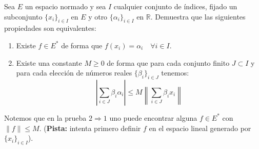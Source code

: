 \begin{ejercicio}%
    Sea $E$ un espacio normado y sea $I$ cualquier conjunto de índices, fijado un subconjunto $\{x_i\}_{i \in I}$ en $E$ y otro $\{\alpha_i\}_{i \in I}$ en $\mathbb{R}$. Demuestra que las siguientes propiedades son equivalentes:
    \begin{enumerate}
        \item Existe $f\in E^\ast$ de forma que $f(x_i) = \alpha_i\quad \forall i \in I$.
        \item Existe una constante $M\geq 0$ de forma que para cada conjunto finito $J\subset I$ y para cada elección de números reales $\{\beta_i\}_{i \in J}$ tenemos:
            \begin{equation*}
                \left|\sum_{i \in J}\beta_i \alpha_i\right| \leq M \left\|\sum_{i \in J} \beta_i x_i\right\|
            \end{equation*}
    \end{enumerate}
    Notemos que en la prueba $2\Longrightarrow 1$ uno puede encontrar alguna $f\in E^\ast$ con $\|f\| \leq M$. (\textbf{Pista:} intenta primero definir $f$ en el espacio lineal generado por $\{x_i\}_{i \in I}$).\\


\end{ejercicio}
